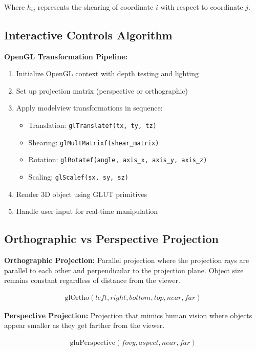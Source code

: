 \documentclass[12pt,a4paper]{article}
\begin{document}
Where $h_{ij}$ represents the shearing of coordinate $i$ with respect to coordinate $j$.

\subsection{Interactive Controls Algorithm}

\textbf{OpenGL Transformation Pipeline:}
\begin{enumerate}
    \item Initialize OpenGL context with depth testing and lighting
    \item Set up projection matrix (perspective or orthographic)
    \item Apply modelview transformations in sequence:
    \begin{itemize}
        \item Translation: \texttt{glTranslatef(tx, ty, tz)}
        \item Shearing: \texttt{glMultMatrixf(shear\_matrix)}
        \item Rotation: \texttt{glRotatef(angle, axis\_x, axis\_y, axis\_z)}
        \item Scaling: \texttt{glScalef(sx, sy, sz)}
    \end{itemize}
    \item Render 3D object using GLUT primitives
    \item Handle user input for real-time manipulation
\end{enumerate}

\subsection{Orthographic vs Perspective Projection}

\textbf{Orthographic Projection:}
Parallel projection where the projection rays are parallel to each other and perpendicular to the projection plane. Object size remains constant regardless of distance from the viewer.

\begin{align}
\text{glOrtho}(left, right, bottom, top, near, far)
\end{align}

\textbf{Perspective Projection:}
Projection that mimics human vision where objects appear smaller as they get farther from the viewer.

\begin{align}
\text{gluPerspective}(fovy, aspect, near, far)
\end{align}
\end{document}
